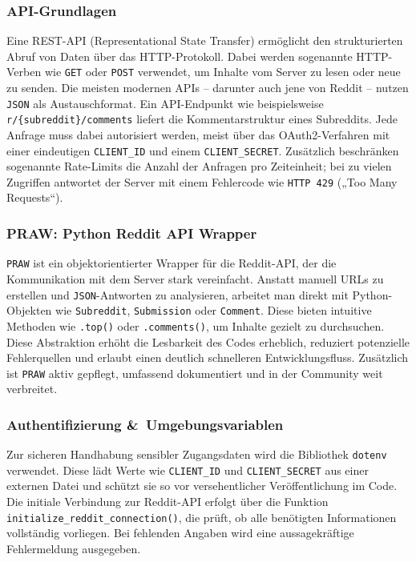 \subsubsection{API-Grundlagen}
Eine REST-API (Representational State Transfer) ermöglicht
den strukturierten Abruf von Daten über das HTTP-Protokoll.
Dabei werden sogenannte HTTP-Verben wie \texttt{GET} oder \texttt{POST} verwendet, um Inhalte vom Server zu lesen oder neue zu senden.
Die meisten modernen APIs – darunter auch jene von Reddit – nutzen \texttt{JSON} als Austauschformat.
Ein API-Endpunkt wie beispielsweise \texttt{r/\{subreddit\}/comments} liefert die Kommentarstruktur eines Subreddits.
Jede Anfrage muss dabei autorisiert werden, meist über das OAuth2-Verfahren mit einer eindeutigen \texttt{CLIENT\_ID} und einem \texttt{CLIENT\_SECRET}.
Zusätzlich beschränken sogenannte Rate-Limits die Anzahl der Anfragen pro Zeiteinheit; bei zu vielen Zugriffen antwortet der Server mit einem Fehlercode wie \texttt{HTTP 429} („Too Many Requests“).

\subsubsection{PRAW: Python Reddit API Wrapper}
\texttt{PRAW} ist ein objektorientierter Wrapper für die Reddit-API, der die Kommunikation mit dem Server stark vereinfacht.
Anstatt manuell URLs zu erstellen und \texttt{JSON}-Antworten zu analysieren, arbeitet man direkt mit Python-Objekten wie \texttt{Subreddit}, \texttt{Submission} oder \texttt{Comment}.
Diese bieten intuitive Methoden wie \texttt{.top()} oder \texttt{.comments()}, um Inhalte gezielt zu durchsuchen.
Diese Abstraktion erhöht die Lesbarkeit des Codes erheblich, reduziert potenzielle Fehlerquellen und erlaubt einen deutlich schnelleren Entwicklungsfluss.
Zusätzlich ist \texttt{PRAW} aktiv gepflegt, umfassend dokumentiert und in der Community weit verbreitet.

\subsubsection{Authentifizierung \&~Umgebungsvariablen}
Zur sicheren Handhabung sensibler Zugangsdaten wird die Bibliothek \texttt{dotenv} verwendet.
Diese lädt Werte wie \texttt{CLIENT\_ID} und \texttt{CLIENT\_SECRET} aus einer externen Datei und schützt sie so vor versehentlicher Veröffentlichung im Code.
Die initiale Verbindung zur Reddit-API erfolgt über die Funktion \texttt{initialize\_reddit\_connection()}, die prüft, ob alle benötigten Informationen vollständig vorliegen.
Bei fehlenden Angaben wird eine aussagekräftige Fehlermeldung ausgegeben.

